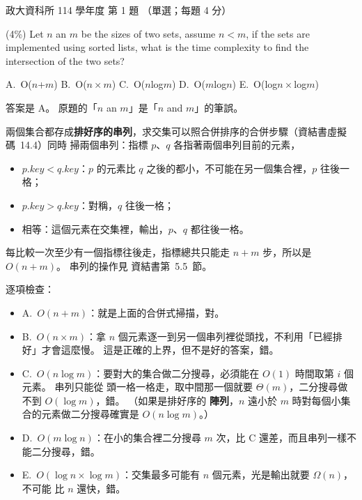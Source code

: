 \begin{pastexam}[label={px:nccu-114-dsa-01}]{政大資科所 114 學年度 第 1 題}
（單選；每題 4 分）

(4\%) Let $n$ an $m$ be the sizes of two sets, assume $n<m$, if the sets are implemented using
sorted lists, what is the time complexity to find the intersection of the two sets?

A.~O($n$+$m$) \qquad B.~O($n\times m$) \qquad C.~O($n$log$m$) \qquad D.~O($m$log$n$) \qquad
E.~O(log$n\times$log$m$)
\end{pastexam}

\begin{pastsoln}
答案是 A。 原題的「$n$ an $m$」是「$n$ and $m$」的筆誤。

兩個集合都存成\textbf{排好序的串列}，求交集可以照合併排序的合併步驟（資結書虛擬碼~14.4）同時
掃兩個串列：指標 $p$、$q$ 各指著兩個串列目前的元素，
\begin{itemize}
\item $p.\mathit{key} < q.\mathit{key}$：$p$ 的元素比 $q$ 之後的都小，不可能在另一個集合裡，$p$ 往後一格；
\item $p.\mathit{key} > q.\mathit{key}$：對稱，$q$ 往後一格；
\item 相等：這個元素在交集裡，輸出，$p$、$q$ 都往後一格。
\end{itemize}
每比較一次至少有一個指標往後走，指標總共只能走 $n + m$ 步，所以是 $O(n + m)$。 串列的操作見
資結書第~5.5~節。

逐項檢查：
\begin{itemize}
\item A.~$O(n + m)$：就是上面的合併式掃描，對。
\item B.~$O(n \times m)$：拿 $n$ 個元素逐一到另一個串列裡從頭找，不利用「已經排好」才會這麼慢。
這是正確的上界，但不是好的答案，錯。
\item C.~$O(n \log m)$：要對大的集合做二分搜尋，必須能在 $O(1)$ 時間取第 $i$ 個元素。 串列只能從
頭一格一格走，取中間那一個就要 $\Theta(m)$，二分搜尋做不到 $O(\log m)$，錯。 （如果是排好序的
\textbf{陣列}，$n$ 遠小於 $m$ 時對每個小集合的元素做二分搜尋確實是 $O(n \log m)$。）
\item D.~$O(m \log n)$：在小的集合裡二分搜尋 $m$ 次，比 C 還差，而且串列一樣不能二分搜尋，錯。
\item E.~$O(\log n \times \log m)$：交集最多可能有 $n$ 個元素，光是輸出就要 $\Omega(n)$，不可能
比 $n$ 還快，錯。
\end{itemize}
\end{pastsoln}
